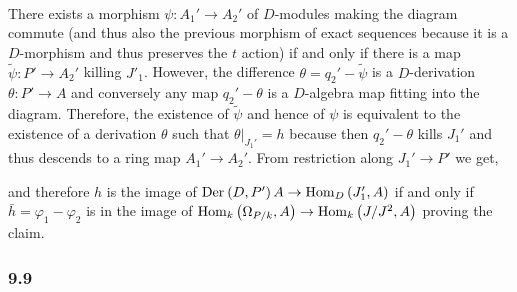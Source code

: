 \documentclass[12pt]{article}
\begin{document}
\bigskip\\
There exists a morphism $\psi : A_1' \to A_2'$ of $D$-modules making the diagram commute (and thus also the previous morphism of exact sequences because it is a $D$-morphism and thus preserves the $t$ action) if and only if there is a map $\tilde{\psi} : P' \to A_2'$ killing $J'_1$. However, the difference $\theta = q_2' - \tilde{\psi}$ is a $D$-derivation $\theta : P' \to A$ and conversely any map $q_2' - \theta$ is a $D$-algebra map fitting into the diagram. Therefore, the existence of $\tilde{\psi}$ and hence of $\psi$ is equivalent to the existence of a derivation $\theta$ such that $\theta|_{J_1'} = h$ because then $q_2' - \theta$ kills $J_1'$ and thus descends to a ring map $A_1' \to A_2'$. From restriction along $J_1' \to P'$ we get,
\begin{center}
\end{center}
and therefore $h$ is the image of $\mathrm{Der}_{} \left( D, P' \right){A} \to \mathrm{Hom}_{D} \left( J_1', A \right)$ if and only if $\bar{h} = \varphi_1 - \varphi_2$ is in the image of $\mathrm{Hom}_{k} \left( \Omega_{P/k}, A \right) \to \mathrm{Hom}_{k} \left( J/J^2, A \right)$ proving the claim.

\subsubsection{9.9}
\end{document}

